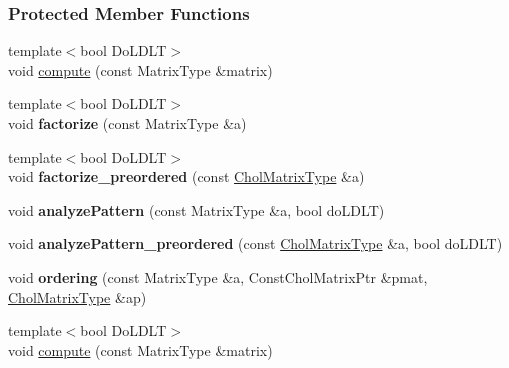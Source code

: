 \subsubsection*{Protected Member Functions}
\begin{DoxyCompactItemize}
\item 
{\footnotesize template$<$bool Do\+L\+D\+LT$>$ }\\void \hyperlink{group___sparse_cholesky___module_a9a741744dda2261cae26cddf96a35bf0}{compute} (const Matrix\+Type \&matrix)
\item 
\mbox{\label{group___sparse_cholesky___module_ad62e844358aa1f5b69690e069f9354c9}} 
{\footnotesize template$<$bool Do\+L\+D\+LT$>$ }\\void {\bfseries factorize} (const Matrix\+Type \&a)
\item 
\mbox{\label{group___sparse_cholesky___module_a340f5bfbe509aad506ebda8d9877d918}} 
{\footnotesize template$<$bool Do\+L\+D\+LT$>$ }\\void {\bfseries factorize\+\_\+preordered} (const \hyperlink{group___sparse_core___module}{Chol\+Matrix\+Type} \&a)
\item 
\mbox{\label{group___sparse_cholesky___module_aaf20ed812a661069f9e484649ae9be1e}} 
void {\bfseries analyze\+Pattern} (const Matrix\+Type \&a, bool do\+L\+D\+LT)
\item 
\mbox{\label{group___sparse_cholesky___module_ac2acafc9b7cdc089f89b6777e7469b73}} 
void {\bfseries analyze\+Pattern\+\_\+preordered} (const \hyperlink{group___sparse_core___module}{Chol\+Matrix\+Type} \&a, bool do\+L\+D\+LT)
\item 
\mbox{\label{group___sparse_cholesky___module_a4e59a8081d09fd8ff1ce9db4becbc150}} 
void {\bfseries ordering} (const Matrix\+Type \&a, Const\+Chol\+Matrix\+Ptr \&pmat, \hyperlink{group___sparse_core___module}{Chol\+Matrix\+Type} \&ap)
\item 
{\footnotesize template$<$bool Do\+L\+D\+LT$>$ }\\void \hyperlink{group___sparse_cholesky___module_a9a741744dda2261cae26cddf96a35bf0}{compute} (const Matrix\+Type \&matrix)
\item 

\end{DoxyCompactItemize}
